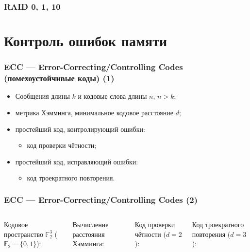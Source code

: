 \begin{frame}
\frametitle{RAID 0, 1, 10}
\end{frame}

\section {Контроль ошибок памяти}


\begin{frame}
\frametitle{ECC — Error-Correcting/Controlling Codes (помехоустойчивые коды) (1)}

\begin{itemize}%
    \item Сообщения длины $k$ и кодовые слова длины $n$, $n > k$;

    \item метрика Хэмминга, минимальное кодовое расстояние $d$;

    \item простейший код, контролирующий ошибки:
    \begin{itemize}
        \item код проверки чётности;
    \end{itemize}

    \item простейший код, исправляющий ошибки:
    \begin{itemize}
        \item код троекратного повторения.
    \end{itemize}
\end{itemize}
\end{frame}

\begin{frame}[fragile]
\frametitle{ECC — Error-Correcting/Controlling Codes (2)}

\small
\begin{columns}
    \column{6.5cm}
    Кодовое пространство $\mathbb F_2^3$
        ($\mathbb F_2 = \{0,1\}$):


Вычисление расстояния Хэмминга:


    \column{5.9cm}
Код проверки чётности ($d=2$):

Код троекратного повторения ($d=3$):
\end{columns}

\end{frame}



